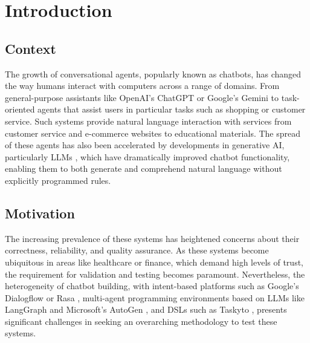 
\chapter{Introduction}\label{chapter:introduction}

\section{Context}

The growth of conversational agents, popularly known as chatbots,
has changed the way humans interact with computers across a range of domains.
From general-purpose assistants like OpenAI's ChatGPT \autocite{ChatGPT} or Google's Gemini \autocite{GoogleGemini} to task-oriented agents that assist users in particular tasks such as shopping or customer service.
Such systems provide natural language interaction with services from customer service and e-commerce websites to educational materials.
The spread of these agents has also been accelerated by developments in generative \ac{AI}, particularly \acp{LLM} \autocite{minaeeLargeLanguageModels2025}, which have dramatically improved chatbot functionality, enabling them to both generate and comprehend natural language without explicitly programmed rules.

\section{Motivation}

The increasing prevalence of these systems has heightened concerns about their correctness, reliability, and quality assurance.
As these systems become ubiquitous in areas like healthcare or finance, which demand high levels of trust, the requirement for validation and testing becomes paramount.
Nevertheless, the heterogeneity of chatbot building, with intent-based platforms such as Google's Dialogflow \autocite{Dialogflow} or Rasa \autocite{Rasa2020}, multi-agent programming environments based on \acp{LLM} like LangGraph \autocite{LangGraph} and Microsoft's AutoGen \autocite{AutoGen}, and \acp{DSL} such as Taskyto \autocite{sanchezcuadradoAutomatingDevelopmentTaskoriented2024},
presents significant challenges in seeking an overarching methodology to test these systems.


